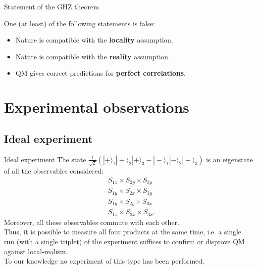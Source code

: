 \documentclass[10pt]{beamer}
\begin{document}
\begin{frame}{Statement of the GHZ theorem}
  \begin{theorem}
    One (at least) of the following statements is false:
    \begin{itemize}
    \item Nature is compatible with the \textbf{locality} assumption.
    \item Nature is compatible with the \textbf{reality} assumption.
    \item QM gives correct predictions for \textbf{perfect correlations}.
    \end{itemize}
  \end{theorem}
\end{frame}




\section{Experimental observations}
\subsection{Ideal experiment}
\begin{frame}{Ideal experiment}
  The state $\frac{1}{\sqrt{2}} \left( |+\rangle_1 |+\rangle_2 |+\rangle_3 - |-\rangle_1 |-\rangle_2 |-\rangle_3 \right)$ is an eigenstate of all the observables considered:
  \begin{equation*}
    \begin{split}
      &S_{1x} \times S_{2y} \times S_{3y}\\
      &S_{1y} \times S_{2x} \times S_{3y}\\
      &S_{1y} \times S_{2y} \times S_{3x}\\
      &S_{1x} \times S_{2x} \times S_{3x}.
    \end{split}
  \end{equation*}
  Moreover, all these observables commute with each other.\\[.5cm]
  Thus, it is possible to measure all four products at the same time, i.e. a single run (with a single triplet) of the experiment suffices to confirm or disprove QM against local-realism.\\[.2cm]
  To our knowledge no experiment of this type has been performed.
\end{frame}
\end{document}
